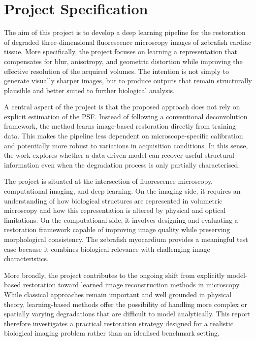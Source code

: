\section{Project Specification}

The aim of this project is to develop a deep learning pipeline for the restoration of degraded three-dimensional fluorescence microscopy images of zebrafish cardiac tissue. More specifically, the project focuses on learning a representation that compensates for blur, anisotropy, and geometric distortion while improving the effective resolution of the acquired volumes. The intention is not simply to generate visually sharper images, but to produce outputs that remain structurally plausible and better suited to further biological analysis.

A central aspect of the project is that the proposed approach does not rely on explicit estimation of the PSF. Instead of following a conventional deconvolution framework, the method learns image-based restoration directly from training data. This makes the pipeline less dependent on microscope-specific calibration and potentially more robust to variations in acquisition conditions. In this sense, the work explores whether a data-driven model can recover useful structural information even when the degradation process is only partially characterised.

The project is situated at the intersection of fluorescence microscopy, computational imaging, and deep learning. On the imaging side, it requires an understanding of how biological structures are represented in volumetric microscopy and how this representation is altered by physical and optical limitations. On the computational side, it involves designing and evaluating a restoration framework capable of improving image quality while preserving morphological consistency. The zebrafish myocardium provides a meaningful test case because it combines biological relevance with challenging image characteristics.

More broadly, the project contributes to the ongoing shift from explicitly model-based restoration toward learned image reconstruction methods in microscopy~\cite{...}. While classical approaches remain important and well grounded in physical theory, learning-based methods offer the possibility of handling more complex or spatially varying degradations that are difficult to model analytically. This report therefore investigates a practical restoration strategy designed for a realistic biological imaging problem rather than an idealised benchmark setting.

